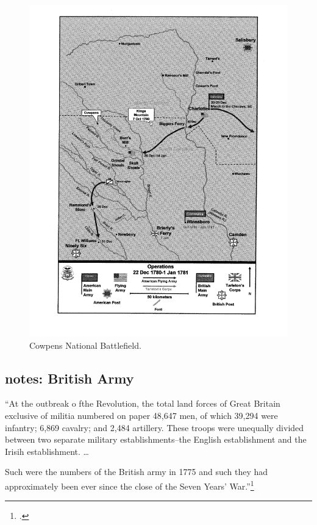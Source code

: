 \begin{figure}[h]
	\singlespacing
	\begin{center}
	  \includegraphics[width=6in]{gfx/rauch_battle_2007_05_p22}
	\end{center}
	\caption{Cowpens National Battlefield.}
	\label{cowppark97}
\end{figure}



\subsection{notes: British Army}
``At the outbreak o fthe Revolution, the total land forces of Great Britain
exclusive of militia numbered on paper 48,647 men, of which 39,294 were
infantry; 6,869 cavalry; and 2,484 artillery. These troops were unequally
divided between two separate military establishments--the English establishment
and the Irisih establishment. \ldots

Such were the numbers of the British army in 1775 and such they had
approximately been ever since the close of the Seven Years' War.''\footcite[1]{curtis_org_1972}

